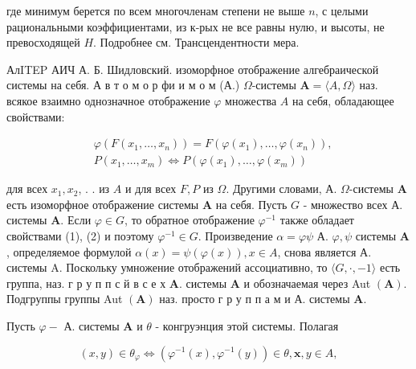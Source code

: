 \documentclass[10pt]{article}
\begin{document}
где минимум берется по всем многочленам степени не выше $n$, с целыми рациональными коэффициентами, из к-рых не все равны нулю, и высоты, не превосходящей $H$. Подробнее см. Трансцендентности мера.



АлITEP АИЧ А. Б. Шидловский. изоморфное отображение алгебраической системы на себя. А в т о м о р фи и м о м (А.) $\Omega$-системы $\boldsymbol{A}=\langle A, \Omega\rangle$ наз. всякое взаимно однозначное отображение $\varphi$ множества $A$ на себя, обладающее свойствами:



\[

\begin{aligned}

& \varphi\left(F\left(x_{1}, \ldots, x_{n}\right)\right)=F\left(\varphi\left(x_{1}\right), \ldots, \varphi\left(x_{n}\right)\right), \\

& P\left(x_{1}, \ldots, x_{m}\right) \Longleftrightarrow P\left(\varphi\left(x_{1}\right), \ldots, \varphi\left(x_{m}\right)\right)

\end{aligned}

\]



для всех $x_{1}, x_{2}$, . . из $A$ и для всех $F, P$ из $\Omega$. Другими словами, А. $\Omega$-системы $\boldsymbol{A}$ есть изоморфное отображение системы $\boldsymbol{A}$ на себя. Пусть $G$ - множество всех А. системы $\boldsymbol{A}$. Если $\varphi \in G$, то обратное отображение $\varphi^{-1}$ также обладает свойствами (1), (2) и поэтому $\varphi^{-1} \in G$. Произведение $\alpha=\varphi \psi$ А. $\varphi, \psi$ системы $\boldsymbol{A}$, определяемое формулой $\alpha(x)=\psi(\varphi(x)), x \in A$, снова является А. системы A. Поскольку умножение отображений ассоциативно, то $\langle G, \cdot,-1\rangle$ есть группа, наз. г р у п п с й в с е х $\mathbf{A}$. системы $\boldsymbol{A}$ и обозначаемая через Aut $(\boldsymbol{A})$. Подгруппы группы Aut $(\boldsymbol{A})$ наз. просто г р у п п а м и А. системы $\boldsymbol{A}$.



Пусть $\varphi-$ А. системы $\boldsymbol{A}$ и $\theta$ - конгруэнция этой системы. Полагая



\[

(x, y) \in \theta_{\varphi} \Longleftrightarrow\left(\varphi^{-1}(x), \varphi^{-1}(y)\right) \in \theta, \boldsymbol{x}, y \in A,

\]
\end{document}
